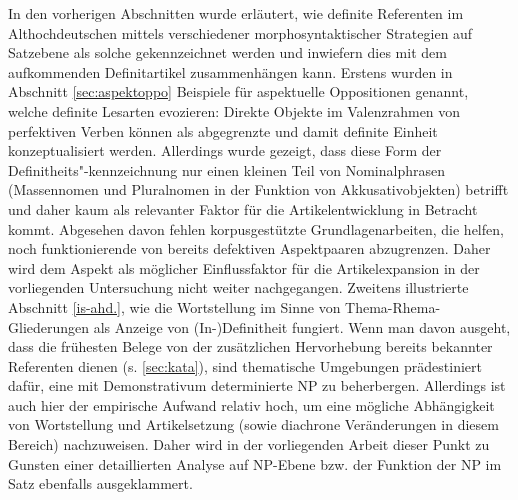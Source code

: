 
In den vorherigen Abschnitten wurde erläutert, wie definite Referenten im Althochdeutschen mittels verschiedener morphosyntaktischer Strategien auf Satzebene als solche gekennzeichnet werden und inwiefern dies mit dem aufkommenden Definitartikel zusammenhängen kann. Erstens wurden in Abschnitt \ref{sec:aspektoppo} Beispiele für aspektuelle Oppositionen genannt, welche  definite Lesarten evozieren: Direkte Objekte im Valenzrahmen von perfektiven Verben können als abgegrenzte und damit definite Einheit konzeptualisiert werden. Allerdings wurde gezeigt, dass diese Form der Definitheits"-kennzeichnung nur einen kleinen Teil von Nominalphrasen (Massennomen und Pluralnomen in der Funktion von Akkusativobjekten) betrifft und daher kaum als relevanter Faktor für die Artikelentwicklung in Betracht kommt. Abgesehen davon fehlen korpusgestützte Grundlagenarbeiten, die helfen, noch funktionierende von bereits defektiven Aspektpaaren abzugrenzen. Daher wird dem Aspekt als möglicher Einflussfaktor für die Artikelexpansion in der vorliegenden Untersuchung nicht weiter nachgegangen. Zweitens illustrierte Abschnitt \ref{is-ahd.}, wie die Wortstellung im Sinne von Thema-Rhema-Gliederungen als Anzeige von (In-)Definitheit fungiert. Wenn man davon ausgeht, dass die frühesten Belege von  der zusätzlichen Hervorhebung bereits bekannter Referenten dienen (s. \ref{sec:kata}), sind thematische Umgebungen prädestiniert dafür, eine mit Demonstrativum determinierte NP zu beherbergen. Allerdings ist auch hier der empirische Aufwand relativ hoch, um eine mögliche Abhängigkeit von Wortstellung und Artikelsetzung (sowie diachrone Veränderungen in diesem Bereich) nachzuweisen. Daher wird in der vorliegenden Arbeit  dieser Punkt zu Gunsten einer detaillierten Analyse auf NP-Ebene bzw. der Funktion der NP im Satz ebenfalls ausgeklammert.

